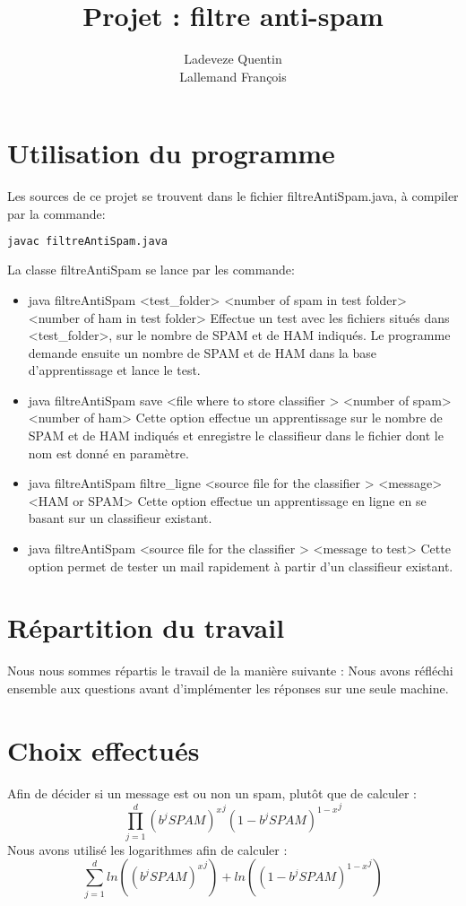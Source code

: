 \documentclass[a4paper, 11pt]{article}
\title{Projet : filtre anti-spam}
\author{Ladeveze Quentin\\Lallemand François}
\begin{document}
\maketitle


\section{Utilisation du programme}
Les sources de ce projet se trouvent dans le fichier filtreAntiSpam.java, à compiler par la commande:
\begin{lstlisting}[language=bash]
  javac filtreAntiSpam.java
\end{lstlisting}
La classe filtreAntiSpam se lance par les commande:
\begin{itemize}[label=\textbullet]
\item java filtreAntiSpam <test\_folder> <number of spam in test folder> <number of ham in test folder>
  Effectue un test avec les fichiers situés dans <test\_folder>, sur le nombre de SPAM et de HAM indiqués. Le programme demande ensuite un nombre de SPAM et de HAM dans la base d'apprentissage et lance le test.
\item java filtreAntiSpam save <file where to store classifier > <number of spam> <number of ham>
  Cette option effectue un apprentissage sur le nombre de SPAM et de HAM indiqués et enregistre le classifieur dans le fichier dont le nom est donné en paramètre.
\item java filtreAntiSpam filtre\_ligne <source file for the classifier > <message> <HAM or SPAM>
  Cette option effectue un apprentissage en ligne en se basant sur un classifieur existant.
\item java filtreAntiSpam <source file for the classifier > <message to test>
  Cette option permet de tester un mail rapidement à partir d'un classifieur existant.
\end{itemize}

\section{Répartition du travail}
Nous nous sommes répartis le travail de la manière suivante :
Nous avons réfléchi ensemble aux questions avant d'implémenter les réponses sur une seule machine.

\section{Choix effectués}
Afin de décider si un message est ou non un spam, plutôt que de calculer :
\[ \prod\limits_{j=1}^d {(b^jSPAM)^x}^j {(1-b^jSPAM)^{1-x}}^j \]
Nous avons utilisé les logarithmes afin de calculer :
\[ \sum\limits_{j=1}^d ln({(b^jSPAM)^x}^j) + ln({(1-b^jSPAM)^{1-x}}^j) \]
\end{document}
